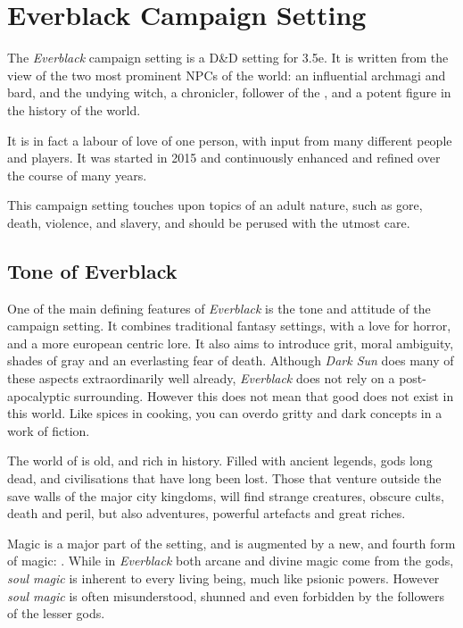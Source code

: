 \chapter{Everblack Campaign Setting}

The \emph{Everblack} campaign setting is a D\&D setting for 3.5e.  It is
written from the view of the two most prominent NPCs of the world:
 an influential archmagi and bard, and
 the undying witch, a chronicler, follower of the
, and a potent figure in the history of the
world.

It is in fact a labour of love of one person, with input from many different
people and players. It was started in 2015 and continuously enhanced and
refined over the course of many years.

This campaign setting touches upon topics of an adult nature, such as gore,
death, violence, and slavery, and should be perused with the utmost care.

\section{Tone of Everblack}

One of the main defining features of \emph{Everblack} is the tone and attitude
of the campaign setting. It combines traditional fantasy settings, with a love
for horror, and a more european centric lore. It also aims to introduce grit,
moral ambiguity, shades of gray and an everlasting fear of death. Although
\emph{Dark Sun} does many of these aspects extraordinarily well already,
\emph{Everblack} does not rely on a post-apocalyptic surrounding. However this
does not mean that good does not exist in this world. Like spices in cooking,
you can overdo gritty and dark concepts in a work of fiction.

The world of  is old, and rich in history. Filled with
ancient legends, gods long dead, and civilisations that have long been lost.
Those that venture outside the save walls of the major city kingdoms, will
find strange creatures, obscure cults, death and peril, but also adventures,
powerful artefacts and great riches.

Magic is a major part of the setting, and is augmented by a new, and fourth
form of magic: . While in \emph{Everblack} both arcane
and divine magic come from the gods, \emph{soul magic} is inherent to every
living being, much like psionic powers. However \emph{soul magic} is often
misunderstood, shunned and even forbidden by the followers of the lesser gods.

